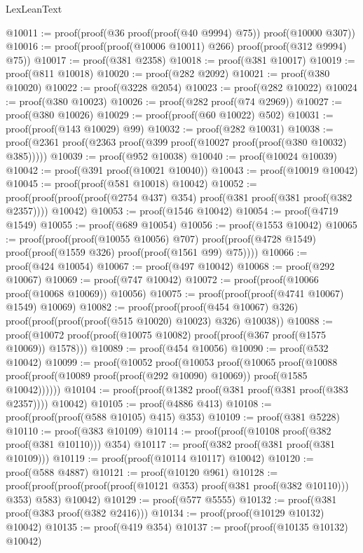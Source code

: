 \begin{lexlean}{LexLeanText}
\begin{coremodule}
@10011 := proof(proof(@36 proof(proof(@40 @9994) @75)) proof(@10000 @307))
@10016 := proof(proof(proof(@10006 @10011) @266) proof(proof(@312 @9994) @75))
@10017 := proof(@381 @2358)
@10018 := proof(@381 @10017)
@10019 := proof(@811 @10018)
@10020 := proof(@282 @2092)
@10021 := proof(@380 @10020)
@10022 := proof(@3228 @2054)
@10023 := proof(@282 @10022)
@10024 := proof(@380 @10023)
@10026 := proof(@282 proof(@74 @2969))
@10027 := proof(@380 @10026)
@10029 := proof(proof(@60 @10022) @502)
@10031 := proof(proof(@143 @10029) @99)
@10032 := proof(@282 @10031)
@10038 := proof(@2361 proof(@2363 proof(@399 proof(@10027 proof(proof(@380 @10032) @385)))))
@10039 := proof(@952 @10038)
@10040 := proof(@10024 @10039)
@10042 := proof(@391 proof(@10021 @10040))
@10043 := proof(@10019 @10042)
@10045 := proof(proof(@581 @10018) @10042)
@10052 := proof(proof(proof(proof(@2754 @437) @354) proof(@381 proof(@381 proof(@382 @2357))))
      @10042)
@10053 := proof(@1546 @10042)
@10054 := proof(@4719 @1549)
@10055 := proof(@689 @10054)
@10056 := proof(@1553 @10042)
@10065 := proof(proof(proof(@10055 @10056) @707)
      proof(proof(@4728 @1549) proof(proof(@1559 @326) proof(proof(@1561 @99) @75))))
@10066 := proof(@424 @10054)
@10067 := proof(@497 @10042)
@10068 := proof(@292 @10067)
@10069 := proof(@747 @10042)
@10072 := proof(proof(@10066 proof(@10068 @10069)) @10056)
@10075 := proof(proof(proof(@4741 @10067) @1549) @10069)
@10082 := proof(proof(proof(@454 @10067) @326)
      proof(proof(proof(proof(@515 @10020) @10023) @326) @10038))
@10088 := proof(@10072 proof(proof(@10075 @10082) proof(proof(@367 proof(@1575 @10069)) @1578)))
@10089 := proof(@454 @10056)
@10090 := proof(@532 @10042)
@10099 := proof(@10052
      proof(@10053
          proof(@10065
              proof(@10088
                  proof(proof(@10089 proof(proof(@292 @10090) @10069)) proof(@1585 @10042))))))
@10104 := proof(proof(@1382 proof(@381 proof(@381 proof(@383 @2357)))) @10042)
@10105 := proof(@4886 @413)
@10108 := proof(proof(proof(@588 @10105) @415) @353)
@10109 := proof(@381 @5228)
@10110 := proof(@383 @10109)
@10114 := proof(proof(@10108 proof(@382 proof(@381 @10110))) @354)
@10117 := proof(@382 proof(@381 proof(@381 @10109)))
@10119 := proof(proof(@10114 @10117) @10042)
@10120 := proof(@588 @4887)
@10121 := proof(@10120 @961)
@10128 := proof(proof(proof(proof(proof(@10121 @353) proof(@381 proof(@382 @10110))) @353) @583)
      @10042)
@10129 := proof(@577 @5555)
@10132 := proof(@381 proof(@383 proof(@382 @2416)))
@10134 := proof(proof(@10129 @10132) @10042)
@10135 := proof(@419 @354)
@10137 := proof(proof(@10135 @10132) @10042)

\end{coremodule}
\end{lexlean}
